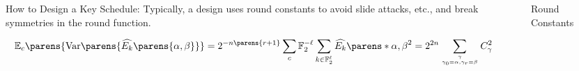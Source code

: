 \begin{columns}[t]
\begin{column}{\sepwid}\end{column}\begin{column}{\onecolwid}

\begin{block}{How to Design a Key Schedule:}
	Typically, a design uses round constants to avoid slide attacks, etc., and break symmetries in the round function.
	\vspace{0.5em}
	\begin{center}
		\noindent{}%
	\end{center}
	\vspace{1em}
	\begin{equation*}
		\mathbb{E}_c\parens{\text{Var}\parens{\widehat{E_k}\parens{\alpha, \beta}}} = 2^{-n\parens{r+1}} \sum_c \F_2^{-\ell} \sum_{k \in \F_2^\ell} \widehat{E_k}\parens*{\alpha,\beta}^2 = 2^{2n} \sum_{\tower{\gamma}{\gamma_0 = \alpha, \gamma_r = \beta}} C_\gamma^2
	\end{equation*}
\end{block}

\end{column}
\begin{column}{\sepwid}\end{column}\begin{column}{\onecolwid}

\begin{block}{Round Constants}
	\vspace{3em}
	\begin{center}
\end{center}
\end{block}
\end{column}
\end{columns}
